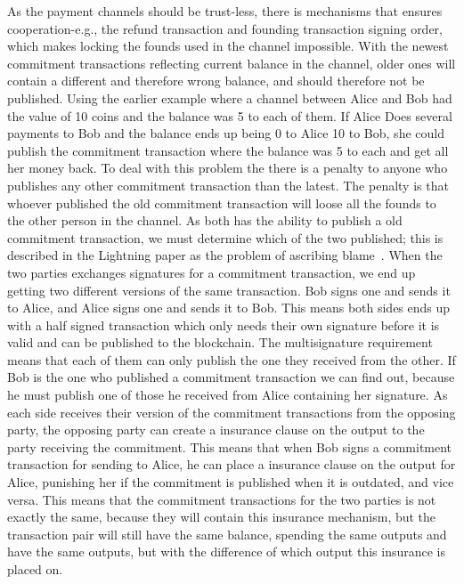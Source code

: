As the payment channels should be trust-less, there is mechanisms that ensures cooperation-e.g., the refund transaction and founding transaction signing order, which makes locking the founds used in the channel impossible. 
With the newest commitment transactions reflecting current balance in the channel, older ones will contain a different and therefore wrong balance, and should therefore not be published.
Using the earlier example where a channel between Alice and Bob had the value of 10 coins and the balance was 5 to each of them. If Alice Does several payments to Bob and the balance ends up being 0 to Alice 10 to Bob, she could publish the commitment transaction where the balance was 5 to each and get all her money back. To deal with this problem the there is a penalty to anyone who publishes any other commitment transaction than the latest. The penalty is that whoever published the old commitment transaction will loose all the founds to the other person in the channel.
As both has the ability to publish a old commitment transaction, we must determine which of the two published; this is described in the Lightning paper as the problem of ascribing blame~\cite{poon2015bitcoin}. When the two parties exchanges signatures for a commitment transaction, 
we end up getting two different versions of the same transaction. Bob signs one and sends it to Alice, and Alice signs one and sends it to Bob. This means both sides ends up with a half signed transaction which only needs their own signature before it is valid and can be published to the blockchain. The multisignature requirement means that each of them can only publish the one they received from the other.
If Bob is the one who published a commitment transaction we can find out, because he must publish one of those he received from Alice containing her signature. As each side receives their version of the commitment transactions from the opposing party, the opposing party can create a insurance clause on the output to the party receiving the commitment. This means that when Bob signs a commitment transaction for sending to Alice, he can place a insurance clause on the output for Alice, punishing her if the commitment is published when it is outdated, and vice versa.
This means that the commitment transactions for the two parties is not exactly the same, because they will contain this insurance mechanism, but the transaction pair will still have the same balance, spending the same outputs and have the same outputs, but with the difference of which output this insurance is placed on.
\\

